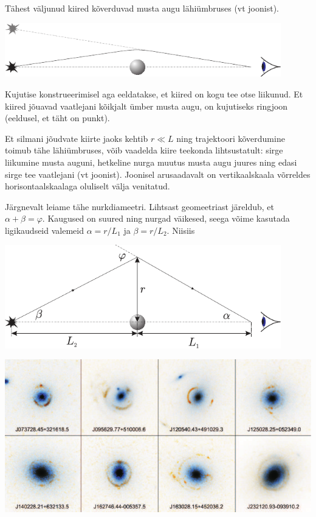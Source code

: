 \documentclass[11pt]{article}
\begin{document}
{{\ifSolution
Tähest väljunud kiired kõverduvad musta augu lähiümbruses (vt joonist). 

\begin{center}
	\includegraphics[width=0.9\textwidth]{2007-v2g-10-lah1}
\end{center}

Kujutise konstrueerimisel aga eeldatakse, et kiired on kogu tee otse liikunud. Et kiired jõuavad vaatlejani kõikjalt ümber musta augu, on kujutiseks ringjoon (eeldusel, et täht on punkt).

Et silmani jõudvate kiirte jaoks kehtib $r \ll L$ ning trajektoori kõverdumine toimub tähe lähiümbruses, võib vaadelda kiire teekonda lihtsustatult: sirge liikumine musta auguni, hetkeline nurga muutus musta augu juures ning edasi sirge tee vaatlejani (vt joonist). Joonisel arusaadavalt on vertikaalskaala võrreldes horisontaalskaalaga oluliselt välja venitatud.

Järgnevalt leiame tähe nurkdiameetri. Lihtsast geomeetriast järeldub, et $\alpha + \beta = \varphi$. Kaugused on suured ning nurgad väikesed, seega võime kasutada ligikaudseid valemeid $\alpha = r/L_1$ ja $\beta = r/L_2$. Niisiis

\begin{center}
	\includegraphics[width=0.9\textwidth]{2007-v2g-10-lah2}
\end{center}

\begin{center}
	\includegraphics[width=\textwidth]{2007-v2g-10-lah3}
\end{center}

}}
\end{document}
